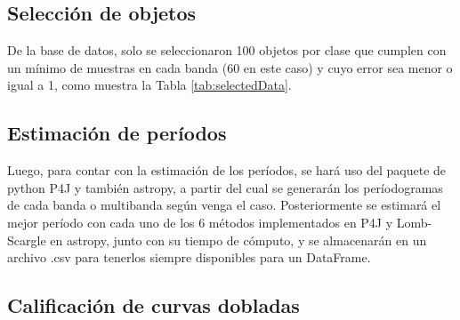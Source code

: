     
    \subsection{Selección de objetos}
    
     De la base de datos, solo se seleccionaron 100 objetos por clase que cumplen con un mínimo de muestras en cada banda (60 en este caso) y cuyo error sea menor o igual a 1, como muestra la Tabla \ref{tab:selectedData}.

    \begin{table}
    \centering
    \caption{Resumen de la base de datos a utilizar.}
    \label{tab:selectedData}
    \end{table}
    
    \subsection{Estimación de períodos}
    
    Luego, para contar con la estimación de los períodos, se hará uso del paquete de python P4J \cite{p4j} y también astropy, a partir del cual se generarán los períodogramas de cada banda o multibanda según venga el caso. Posteriormente se estimará el mejor período con cada uno de los 6 métodos implementados en P4J y Lomb-Scargle en astropy, junto con su tiempo de cómputo, y se almacenarán en un archivo .csv para tenerlos siempre disponibles para un DataFrame.
    
    
    \subsection{Calificación de curvas dobladas}
    
